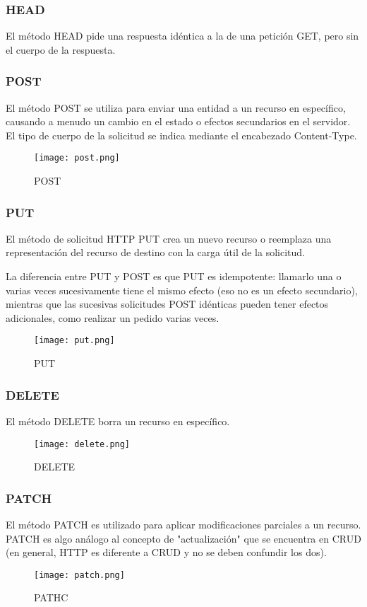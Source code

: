 \subsubsection{HEAD}
El método HEAD pide una respuesta idéntica a la de una petición GET, pero sin el cuerpo de la respuesta.

\subsubsection{POST}
El método POST se utiliza para enviar una entidad a un recurso en específico, causando a menudo un cambio en el estado o efectos secundarios en el servidor. \\
El tipo de cuerpo de la solicitud se indica mediante el encabezado Content-Type.

\begin{figure}[H]
	\center
	\texttt{[image: post.png]}
	\caption{POST}
	\label{fig:super}
\end{figure}

\subsubsection{PUT}
El método de solicitud HTTP PUT crea un nuevo recurso o reemplaza una representación del recurso de destino con la carga útil de la solicitud.

La diferencia entre PUT y POST es que PUT es idempotente: llamarlo una o varias veces sucesivamente tiene el mismo efecto (eso no es un efecto secundario), mientras que las sucesivas solicitudes POST idénticas pueden tener efectos adicionales, como realizar un pedido varias veces.
\begin{figure}[H]
	\center
	\texttt{[image: put.png]}
	\caption{PUT}
	\label{fig:super}
\end{figure}

\subsubsection{DELETE}
El método DELETE borra un recurso en específico.
\begin{figure}[H]
	\center
	\texttt{[image: delete.png]}
	\caption{DELETE}
	\label{fig:super}
\end{figure}

\subsubsection{PATCH}
El método PATCH  es utilizado para aplicar modificaciones parciales a un recurso.\\
PATCH es algo análogo al concepto de "actualización" que se encuentra en CRUD (en general, HTTP es diferente a CRUD y no se deben confundir los dos).
\begin{figure}[H]
	\center
	\texttt{[image: patch.png]}
	\caption{PATHC}
	\label{fig:super}
\end{figure}



